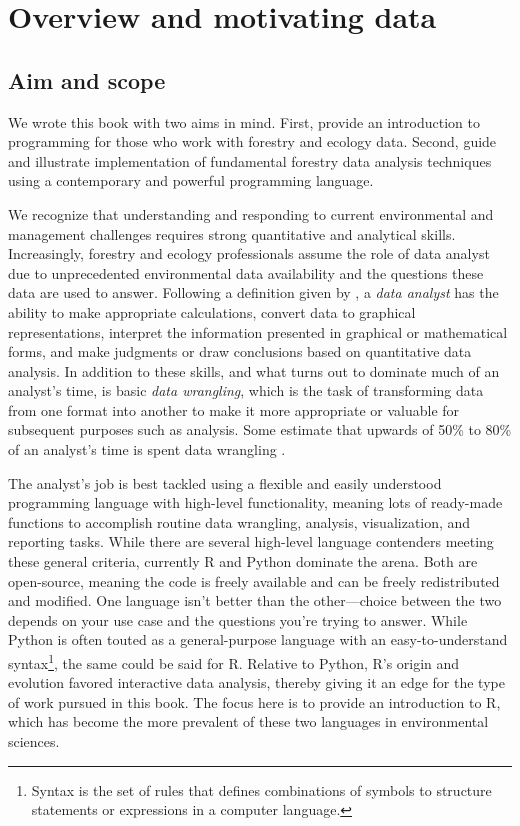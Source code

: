 \documentclass[
  11pt,
]{krantz}
\theoremstyle{definition}
\theoremstyle{definition}
\theoremstyle{definition}
\theoremstyle{definition}
\theoremstyle{remark}
\begin{document}
\hypertarget{overview}{%
\chapter{Overview and motivating data}\label{overview}}

\hypertarget{aim}{%
\section{Aim and scope}\label{aim}}

We wrote this book with two aims in mind. First, provide an introduction to programming for those who work with forestry and ecology data. Second, guide and illustrate implementation of fundamental forestry data analysis techniques using a contemporary and powerful programming language.

We recognize that understanding and responding to current environmental and management challenges requires strong quantitative and analytical skills. Increasingly, forestry and ecology professionals assume the role of data analyst due to unprecedented environmental data availability and the questions these data are used to answer. Following a definition given by \citet{Bravo16}, a \emph{data analyst} has the ability to make appropriate calculations, convert data to graphical representations, interpret the information presented in graphical or mathematical forms, and make judgments or draw conclusions based on quantitative data analysis. In addition to these skills, and what turns out to dominate much of an analyst's time, is basic \emph{data wrangling}, which is the task of transforming data from one format into another to make it more appropriate or valuable for subsequent purposes such as analysis. Some estimate that upwards of 50\% to 80\% of an analyst's time is spent data wrangling \citep{Lohr2014}.

The analyst's job is best tackled using a flexible and easily understood programming language with high-level functionality, meaning lots of ready-made functions to accomplish routine data wrangling, analysis, visualization, and reporting tasks. While there are several high-level language contenders meeting these general criteria, currently R \citep{R} and Python \citep{Python} dominate the arena. Both are open-source, meaning the code is freely available and can be freely redistributed and modified. One language isn't better than the other---choice between the two depends on your use case and the questions you're trying to answer. While Python is often touted as a general-purpose language with an easy-to-understand syntax\footnote{Syntax is the set of rules that defines combinations of symbols to structure statements or expressions in a computer language.}, the same could be said for R. Relative to Python, R's origin and evolution favored interactive data analysis, thereby giving it an edge for the type of work pursued in this book. The focus here is to provide an introduction to R, which has become the more prevalent of these two languages in environmental sciences.
\end{document}
